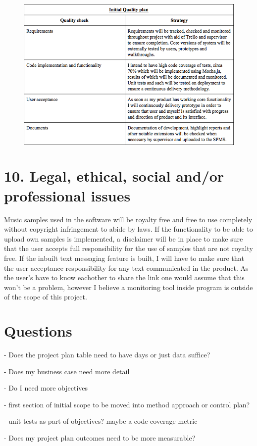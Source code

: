 \documentclass[a4paper]{article}
\begin{document}
\begin{figure}

    \includegraphics[width=\linewidth]{../../img/initial-quality-table.png}

\end{figure}

\section{10. Legal, ethical, social and/or professional issues}

Music samples used in the software will be royalty free and free to use completely without copyright infringement to abide by laws. If the functionality to be able to upload own samples is implemented, a disclaimer will be in place to make sure that the user accepts full responsibility for the use of samples that are not royalty free. If the inbuilt text messaging feature is built, I will have to make sure that the user acceptance responsibility for any text communicated in the product. As the user's have to know eachother to share the link one would assume that this won't be a problem, however I believe a monitoring tool inside program is outside of the scope of this project.

\section{Questions}

- Does the project plan table need to have days or just data suffice? \par
- Does my business case need more detail \par
- Do I need more objectives \par
- first section of initial scope to be moved into method approach or control plan? \par
- unit tests as part of objectives? maybe a code coverage metric \par
- Does my project plan outcomes need to be more measurable? \par
\end{document}
